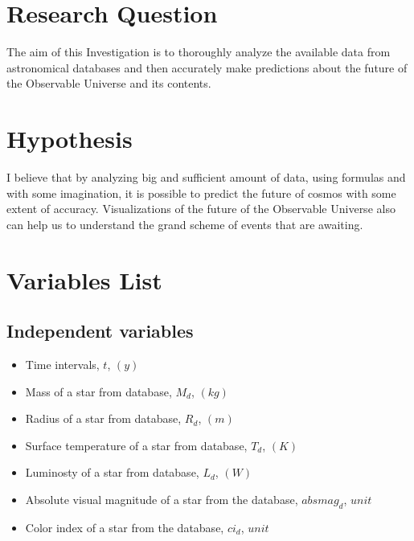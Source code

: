 \documentclass[a4paper]{IEEEtran}
\begin{document}
\section{Research Question}

The aim of this Investigation is to thoroughly analyze the available data from astronomical databases and then accurately make predictions about the future of the Observable Universe and its contents. 

\section{Hypothesis}

I believe that by analyzing big and sufficient amount of data, using formulas and with some imagination, it is possible to predict the future of cosmos with some extent of accuracy. Visualizations of the future of the Observable Universe also can help us to understand the grand scheme of events that are awaiting.

\section{Variables List}

\subsection{Independent variables}

\begin{itemize}

  \item Time intervals, $t$, $(y)$

  \item Mass of a star from database, $M_d$, $(kg)$

  \item Radius of a star from database, $R_d$, $(m)$ 

  \item Surface temperature of a star from database, $T_d$, $(K)$

  \item Luminosty of a star from database, $L_d$, $(W)$

  \item Absolute visual magnitude of a star from the database, $absmag_d$, $unit$ 

  \item Color index of a star from the database, $ci_d$, $unit$
    
  \end{itemize}
\end{document}

